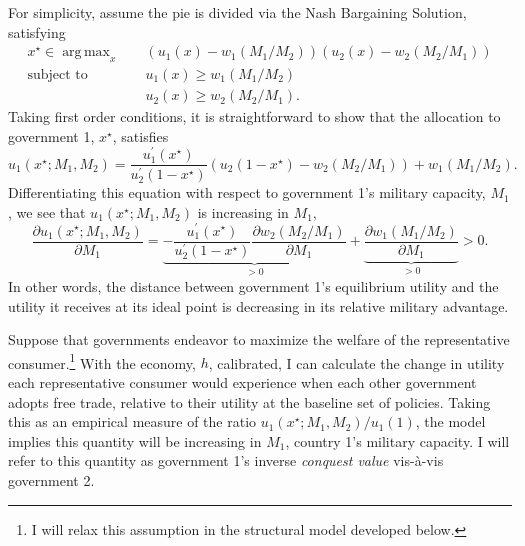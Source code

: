 \documentclass{puthesis}
\DeclareMathOperator*{\argmax}{arg\,max}
\begin{document}
For simplicity, assume the pie is divided via the Nash Bargaining
Solution, satisfying \begin{equation}
\begin{split}
x^\star \in \argmax_x & \quad \left( u_1(x) - w_1(M_1 / M_2) \right) \left( u_2(x) - w_2(M_2 / M_1) \right) \\
\text{subject to} & \quad u_1(x) \geq w_1(M_1 / M_2) \\
& \quad u_2(x) \geq w_2(M_2 / M_1) .
\end{split}
\end{equation} Taking first order conditions, it is straightforward to
show that the allocation to government 1, \(x^\star\), satisfies \[
u_1(x^\star; M_1, M_2) = \frac{u_1^\prime(x^\star)}{u_2^\prime(1 - x^\star)} \left( u_2(1 - x^\star) - w_2(M_2 / M_1) \right) + w_1(M_1 / M_2) . 
\] Differentiating this equation with respect to government 1's military
capacity, \(M_1\), we see that \(u_1(x^\star; M_1, M_2)\) is increasing
in \(M_1\), \[
\frac{\partial u_1(x^\star; M_1, M_2) }{\partial M_1} = \underbrace{- \frac{u_1^\prime(x^\star)}{u_2^\prime(1 - x^\star)} \frac{\partial w_2(M_2 / M_1)}{\partial M_1}}_{>0} + \underbrace{\frac{\partial w_1(M_1 / M_2)}{ \partial M_1}}_{>0} > 0 .
\] In other words, the distance between government 1's equilibrium
utility and the utility it receives at its ideal point is decreasing in
its relative military advantage.

Suppose that governments endeavor to maximize the welfare of the
representative consumer.\footnote{I will relax this assumption in the
  structural model developed below.} With the economy, \(h\),
calibrated, I can calculate the change in utility each representative
consumer would experience when each other government adopts free trade,
relative to their utility at the baseline set of policies. Taking this
as an empirical measure of the ratio
\(u_1(x^\star; M_1, M_2) / u_1(1)\), the model implies this quantity
will be increasing in \(M_1\), country 1's military capacity. I will
refer to this quantity as government 1's inverse \emph{conquest value}
vis-à-vis government 2.
\end{document}
